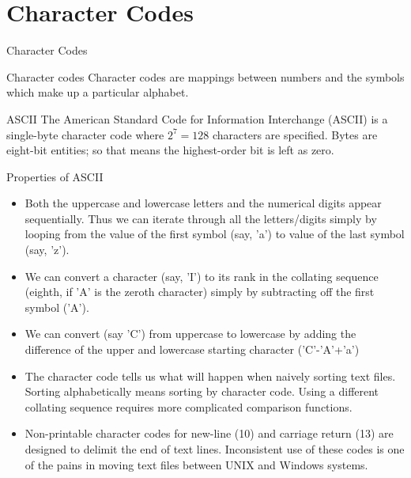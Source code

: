 \documentclass{beamer}
\begin{document}
\section{Character Codes}
\begin{frame}{Character Codes}
  \begin{alertblock}{Character codes}
    Character codes are mappings between numbers and the symbols which make up a particular alphabet.
  \end{alertblock}
  \begin{block}{ASCII}
    The American Standard Code for Information Interchange (ASCII) is a single-byte character code where $2^7 = 128$ characters are specified.
    Bytes are eight-bit entities; so that means the highest-order bit is left as zero.
    
  \end{block}
  

\end{frame}

\begin{frame}{Properties of ASCII}
  \begin{itemize}
  \item Both the uppercase and lowercase letters and the numerical digits appear sequentially. Thus we can iterate through all the letters/digits simply by looping from the value of the first symbol (say, 'a') to value of the last symbol (say, 'z'). 
  \item We can convert a character (say, 'I') to its rank in the collating sequence (eighth, if 'A' is the zeroth character) simply by subtracting off the first symbol ('A').
  \item We can convert (say 'C') from uppercase to lowercase by adding the difference of the upper and lowercase starting character ('C'-'A'+'a')
  \item The character code tells us what will happen when naively sorting text files. Sorting alphabetically means sorting by character code. Using a different collating sequence requires more complicated comparison functions.
  \item Non-printable character codes for new-line (10) and carriage return (13) are designed to delimit the end of text lines.
    Inconsistent use of these codes is one of the pains in moving text files between UNIX and Windows systems.
 \end{itemize}
\end{frame}
\end{document}
